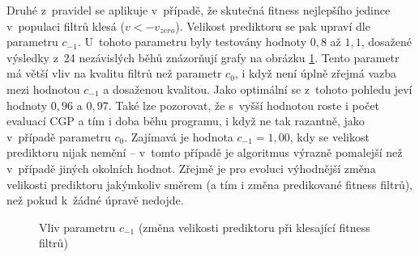 Druhé z~pravidel se aplikuje v~případě, že skutečná fitness nejlepšího jedince v~populaci filtrů klesá ($v < -v_\mathit{zero}$). Velikost prediktoru se pak upraví dle parametru $c_{-1}$. U~tohoto parametru byly testovány hodnoty $0,8$ až $1,1$, dosažené výsledky z~24 nezávislých běhů znázorňují grafy na obrázku \ref{plotDecrcoef-30kg}. Tento parametr má větší vliv na kvalitu filtrů než parametr $c_0$, i když není úplně zřejmá vazba mezi hodnotou $c_{-1}$ a dosaženou kvalitou. Jako optimální se z~tohoto pohledu jeví hodnoty $0,96$ a $0,97$. Také lze pozorovat, že s~vyšší hodnotou roste i počet evaluací CGP a tím i doba běhu programu, i když ne tak razantně, jako v~případě parametru $c_0$. Zajímavá je hodnota $c_{-1} = 1,00$, kdy se velikost prediktoru nijak nemění -- v~tomto případě je algoritmus výrazně pomalejší než v~případě jiných okolních hodnot. Zřejmě je pro evoluci výhodnější změna velikosti prediktoru jakýmkoliv směrem (a tím i změna predikované fitness filtrů), než pokud k~žádné úpravě nedojde.

\begin{figure}[tbp]
    \centering
    \baselineskip
    \caption{Vliv parametru $c_{-1}$ (změna velikosti prediktoru při klesající fitness filtrů)}
    \label{plotDecrcoef-30kg}
\end{figure}

